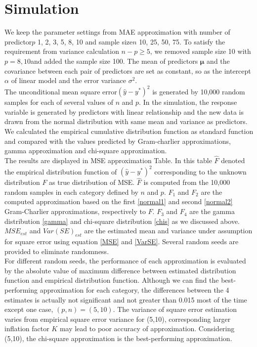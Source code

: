 \documentclass[11pt]{article}
\begin{document}
\section{Simulation}

We keep the parameter settings from MAE approximation with number of predictor$p$ 1, 2, 3, 5, 8, 10 and sample size$n$ 10, 25, 50, 75. To satisfy the requirement from variance calculation $n-p\geq 5$, we removed sample size 10 with $p =  8, 10$and added the sample size 100.  The mean of predictors $\boldsymbol{\mu}$ and the covariance between each pair of predictors are set as constant, so as the intercept $\alpha$ of linear model and the error variance $\sigma^2$. 
\\

The unconditional mean square error$(\hat{y}-y^*)^2$ is generated by 10,000 random samples for each of several values of $n$ and $p$. In the simulation, the response variable is generated by predictors with linear relationship and the new data is drawn from the normal distribution with same mean and variance as predictors. We calculated the empirical cumulative distribution function as standard function and compared with the values predicted by Gram-charlier approximations, gamma approximation and chi-square approximation.
\\

The results are displayed in MSE approximation Table. In this table $\hat{F}$ denoted the empirical distribution function of $(\hat{y}-y^*)^2$ corresponding to the unknown distribution $F$ as true distribution of MSE.  $\hat{F}$ is computed from the 10,000 random samples in each category defined by $n$ and $p$. $F_1$ and $F_2$ are the computed approximation based on the first \ref{normal1} and second \ref{normal2} Gram-Charlier approximations, respectively to $F$. $F_3$ and $F_4$ are the gamma distribution \ref{gamma} and chi-square distribution \ref{chis} as we discussed above. $MSE_{est}$ and $Var(SE)_{est}$ are the estimated mean and variance under assumption for square error using equation \ref{MSE} and \ref{VarSE}. Several random seeds are provided to eliminate randomness.
\\

For different random seeds, the performance of each approximation is evaluated by the absolute value of maximum difference between estimated distribution function and empirical distribution function. Although we can find the best-performing approximation for each category, the differences between the 4 estimates is actually not significant and not greater than 0.015 most of the time except one case, $(p,n) = (5,10)$.  The variance of square error estimation varies from empirical square error variance for (5,10), corresponding larger inflation factor $K$ may lead to poor accuracy of approximation. Considering (5,10), the chi-square approximation is the best-performing approximation.
\end{document}
